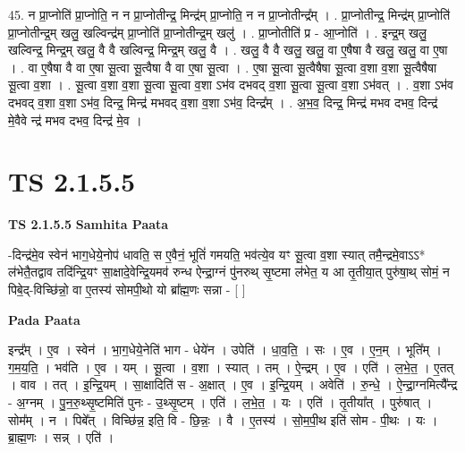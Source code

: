 \documentclass[17pt]{extarticle}
\begin{document}
45. न प्रा॒प्नोति॑ प्रा॒प्नोति॒ न न प्रा॒प्नोतीन्द्र॒ मिन्द्र॑म् प्रा॒प्नोति॒ न न प्रा॒प्नोतीन्द्र᳚म् । . प्रा॒प्नोतीन्द्र॒ मिन्द्र॑म् प्रा॒प्नोति॑ प्रा॒प्नोतीन्द्र॒म् खलु॒ खल्विन्द्र॑म् प्रा॒प्नोति॑ प्रा॒प्नोतीन्द्र॒म् खलु॑ । . प्रा॒प्नोतीति॑ प्र - आ॒प्नोति॑ । . इन्द्र॒म् खलु॒ खल्विन्द्र॒ मिन्द्र॒म् खलु॒ वै वै खल्विन्द्र॒ मिन्द्र॒म् खलु॒ वै । . खलु॒ वै वै खलु॒ खलु॒ वा ए॒षैषा वै खलु॒ खलु॒ वा ए॒षा । . वा ए॒षैषा वै वा ए॒षा सू॒त्वा सू॒त्वैषा वै वा ए॒षा सू॒त्वा । . ए॒षा सू॒त्वा सू॒त्वैषैषा सू॒त्वा व॒शा व॒शा सू॒त्वैषैषा सू॒त्वा व॒शा । . सू॒त्वा व॒शा व॒शा सू॒त्वा सू॒त्वा व॒शा ऽभ॑व दभवद् व॒शा सू॒त्वा सू॒त्वा व॒शा ऽभ॑वत् । . व॒शा ऽभ॑व दभवद् व॒शा व॒शा ऽभ॑व॒ दिन्द्र॒ मिन्द्र॑ मभवद् व॒शा व॒शा ऽभ॑व॒ दिन्द्र᳚म् । . अ॒भ॒व॒ दिन्द्र॒ मिन्द्र॑ मभव दभव॒ दिन्द्र॑ मे॒वैवे न्द्र॑ मभव दभव॒ दिन्द्र॑ मे॒व । \newline
\pagebreak
{}

\section{ TS 2.1.5.5 }

\textbf{TS 2.1.5.5 } \newline
\textbf{Samhita Paata} \newline

-दिन्द्र॑मे॒व स्वेन॑ भाग॒धेये॒नोप॑ धावति॒ स ए॒वैनं॒ भूतिं॑ गमयति॒ भव॑त्ये॒व यꣳ सू॒त्वा व॒शा स्यात् तमै॒न्द्रमे॒वाऽऽ* ल॑भेतै॒तद्वाव तदि॑न्द्रि॒यꣳ सा॒क्षादे॒वेन्द्रि॒यमव॑ रुन्ध ऐन्द्रा॒ग्नं पु॑नरुथ् सृ॒ष्टमा ल॑भेत॒ य आ तृ॒तीया॒त् पुरु॑षा॒थ् सोमं॒ न पिबे॒द्-विच्छि॑न्नो॒ वा ए॒तस्य॑ सोमपी॒थो यो ब्रा᳚ह्म॒णः सन्ना - [  ] \newline

\textbf{Pada Paata} \newline

इन्द्र᳚म् । ए॒व । स्वेन॑ । भा॒ग॒धेये॒नेति॑ भाग - धेये॑न । उपेति॑ । धा॒व॒ति॒ । सः । ए॒व । ए॒न॒म् । भूति᳚म् । ग॒म॒य॒ति॒ । भव॑ति । ए॒व । यम् । सू॒त्वा । व॒शा । स्यात् । तम् । ऐ॒न्द्रम् । ए॒व । एति॑ । ल॒भे॒त॒ । ए॒तत् । वाव । तत् । इ॒न्द्रि॒यम् । सा॒क्षादिति॑ स - अ॒क्षात् । ए॒व । इ॒न्द्रि॒यम् । अवेति॑ । रु॒न्धे॒ । ऐ॒न्द्रा॒ग्नमित्यै᳚न्द्र - अ॒ग्नम् । पु॒न॒रु॒थ्सृ॒ष्टमिति॑ पुनः - उ॒थ्सृ॒ष्टम् । एति॑ । ल॒भे॒त॒ । यः । एति॑ । तृ॒तीया᳚त् । पुरु॑षात् । सोम᳚म् । न । पिबे᳚त् । विच्छि॑न्न॒ इति॒ वि - छि॒न्नः॒ । वै । ए॒तस्य॑ । सो॒म॒पी॒थ इति॑ सोम - पी॒थः । यः । ब्रा॒ह्म॒णः । सन्न् । एति॑ ।  \newline
\end{document}
